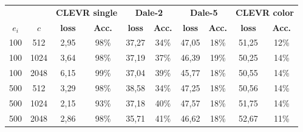 \begin{table}[b]
    \centering
    \begin{tabular}{cc|cc|cc|cc|cc}
        \toprule
               &        & \multicolumn{2}{c}{\textbf{CLEVR single}} & \multicolumn{2}{c}{\textbf{Dale-2}} & \multicolumn{2}{c}{\textbf{Dale-5}} & \multicolumn{2}{c}{\textbf{CLEVR color}}                                                                 \\  \cmidrule(lr){3-4}\cmidrule(lr){5-6}\cmidrule(lr){7-8}\cmidrule(lr){9-10}
        $e_i$  & $c$    & \textbf{loss}                             & \textbf{Acc.}                       & \textbf{loss}                       & \textbf{Acc.}                            & \textbf{loss} & \textbf{Acc.} & \textbf{loss} & \textbf{Acc.} \\\midrule
        {100}  & {512}  & {2,95}                                    & {98\%}                              & {37,27}                             & {34\%}                                   & {47,05}       & {18\%}        & {51,25}       & {12\%}        \\
        {100}  & {1024} & {3,64}                                    & {98\%}                              & {37,19}                             & {37\%}                                   & {46,39}       & {19\%}        & {50,25}       & {14\%}        \\
        {100}  & {2048} & {6,15}                                    & {99\%}                              & {37,04}                             & {39\%}                                   & {45,77}       & {18\%}        & {50,55}       & {14\%}        \\
        {500}  & {512}  & {3,29}                                    & {98\%}                              & {38,58}                             & {34\%}                                   & {47,25}       & {18\%}        & {50,56}       & {14\%}        \\
        {500}  & {1024} & {2,15}                                    & {93\%}                              & {37,18}                             & {40\%}                                   & {47,57}       & {18\%}        & {51,75}       & {14\%}        \\
        {500}  & {2048} & {2,86}                                    & {98\%}                              & {35,71}                             & {41\%}                                   & {46,62}       & {18\%}        & {52,67}       & {11\%}        \\

\end{tabular}
\end{table}
